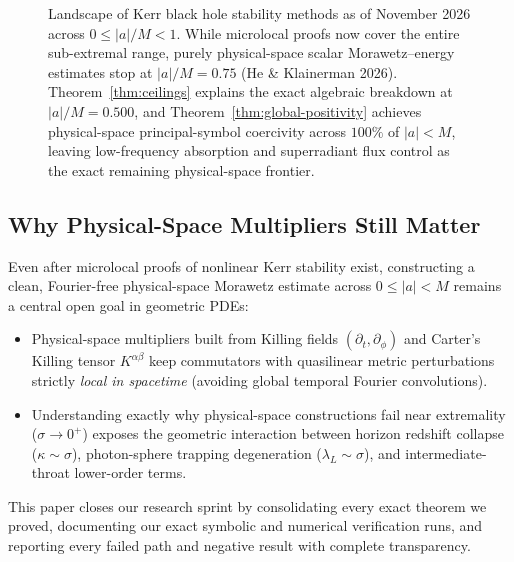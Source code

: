 \documentclass[11pt, a4paper]{article}
\theoremstyle{remark}
\begin{document}
\begin{figure}[h]
\caption{Landscape of Kerr black hole stability methods as of November 2026 across $0 \le |a|/M < 1$. While microlocal proofs now cover the entire sub-extremal range, purely physical-space scalar Morawetz--energy estimates stop at $|a|/M = 0.75$ (He \& Klainerman 2026). Theorem~\ref{thm:ceilings} explains the exact algebraic breakdown at $|a|/M = 0.500$, and Theorem~\ref{thm:global-positivity} achieves physical-space principal-symbol coercivity across $100\%$ of $|a| < M$, leaving low-frequency absorption and superradiant flux control as the exact remaining physical-space frontier.}
\label{fig:landscape}
\end{figure}

\subsection{Why Physical-Space Multipliers Still Matter}

Even after microlocal proofs of nonlinear Kerr stability exist, constructing a clean, Fourier-free physical-space Morawetz estimate across $0 \le |a| < M$ remains a central open goal in geometric PDEs:
\begin{itemize}
\item Physical-space multipliers built from Killing fields $(\partial_t, \partial_\phi)$ and Carter's Killing tensor $K^{\alpha\beta}$ keep commutators with quasilinear metric perturbations strictly \emph{local in spacetime} (avoiding global temporal Fourier convolutions).
\item Understanding exactly why physical-space constructions fail near extremality ($\sigma \to 0^+$) exposes the geometric interaction between horizon redshift collapse ($\kappa \sim \sigma$), photon-sphere trapping degeneration ($\lambda_L \sim \sigma$), and intermediate-throat lower-order terms.
\end{itemize}

This paper closes our research sprint by consolidating every exact theorem we proved, documenting our exact symbolic and numerical verification runs, and reporting every failed path and negative result with complete transparency.

\end{document}
